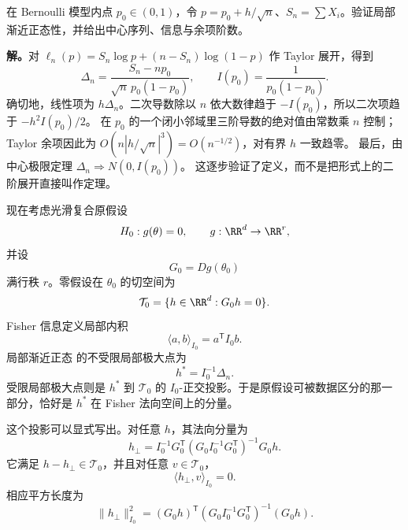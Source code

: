 \begin{workedexample}
在 Bernoulli 模型内点 \(p_0\in(0,1)\)，令
\(p=p_0+h/\sqrt n\)、\(S_n=\sum X_i\)。验证局部渐近正态性，并给出中心序列、信息与余项阶数。

\textbf{解。}对
\(\ell_n(p)=S_n\log p+(n-S_n)\log(1-p)\) 作 Taylor 展开，得到
\[
\Delta_n=\frac{S_n-np_0}{\sqrt n\,p_0(1-p_0)},\qquad
I(p_0)=\frac1{p_0(1-p_0)}.
\]
确切地，线性项为 \(h\Delta_n\)。二次导数除以 \(n\) 依大数律趋于
\(-I(p_0)\)，所以二次项趋于 \(-h^2I(p_0)/2\)。
在 \(p_0\) 的一个闭小邻域里三阶导数的绝对值由常数乘 \(n\) 控制；
Taylor 余项因此为
\(O(n|h/\sqrt n|^3)=O(n^{-1/2})\)，对有界 \(h\) 一致趋零。
最后，由中心极限定理 \(\Delta_n\Rightarrow N(0,I(p_0))\)。
这逐步验证了定义，而不是把形式上的二阶展开直接叫作定理。
\end{workedexample}

\begin{proposition}
现在考虑光滑复合原假设
\[
 H_0:g(\theta)=0,
 \qquad
 g:\RR^d\to\RR^r,
\]
并设
\[
 G_0=Dg(\theta_0)
\]
满行秩 $r$。零假设在 $\theta_0$ 的切空间为
\[
 \mathcal T_0
 =\{h\in\RR^d:G_0h=0\}.
\]
Fisher 信息定义局部内积
\[
 \langle a,b\rangle_{I_0}
 =a^{\mathsf T}I_0b.
\]
局部渐近正态 的不受限局部极大点为
\[
 h^*=I_0^{-1}\Delta_n.
\]
受限局部极大点则是 $h^*$ 到 $\mathcal T_0$ 的 $I_0$-正交投影。于是原假设可被数据区分的那一部分，恰好是 $h^*$ 在 Fisher 法向空间上的分量。

这个投影可以显式写出。对任意 $h$，其法向分量为
\begin{equation}\label{eq:math-stat-fisher-normal-projection}
 h_\perp
 =I_0^{-1}G_0^{\mathsf T}
 (G_0I_0^{-1}G_0^{\mathsf T})^{-1}
 G_0h.
\end{equation}
它满足 $h-h_\perp\in\mathcal T_0$，并且对任意 $v\in\mathcal T_0$，
\[
 \langle h_\perp,v\rangle_{I_0}=0.
\]
相应平方长度为
\begin{equation}\label{eq:math-stat-fisher-normal-distance}
 \|h_\perp\|_{I_0}^2
 =(G_0h)^{\mathsf T}
 (G_0I_0^{-1}G_0^{\mathsf T})^{-1}
 (G_0h).
\end{equation}
\end{proposition}

